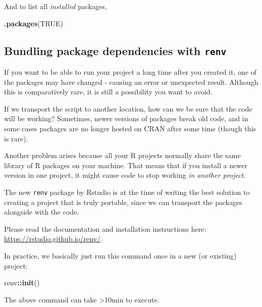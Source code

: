 \documentclass[]{book}
\newenvironment{Shaded}{\begin{snugshade}}{\end{snugshade}}
\newcommand{\KeywordTok}[1]{\textcolor[rgb]{0.13,0.29,0.53}{\textbf{#1}}}
\newcommand{\NormalTok}[1]{#1}
\newcommand{\OperatorTok}[1]{\textcolor[rgb]{0.81,0.36,0.00}{\textbf{#1}}}
\newcommand{\OtherTok}[1]{\textcolor[rgb]{0.56,0.35,0.01}{#1}}
\let\BeginKnitrBlock\begin \let\EndKnitrBlock\end
\begin{document}
And to list all \emph{installed} packages,

\begin{Shaded}
\begin{Highlighting}[]
\KeywordTok{.packages}\NormalTok{(}\OtherTok{TRUE}\NormalTok{)}
\end{Highlighting}
\end{Shaded}

\hypertarget{bundling-package-dependencies-with-renv}{%
\subsection{\texorpdfstring{Bundling package dependencies with \texttt{renv}}{Bundling package dependencies with renv}}\label{bundling-package-dependencies-with-renv}}

If you want to be able to run your project a long time after you created it, one of the packages may have changed - causing an error or unexpected result. Although this is comparatively rare, it is still a possibility you want to avoid.

If we transport the script to another location, how can we be sure that the code will be working? Sometimes, newer versions of packages break old code, and in some cases packages are no longer hosted on CRAN after some time (though this is rare).

Another problem arises because all your R projects normally share the same library of R packages on your machine. That means that if you install a newer version in one project, it might cause code to stop working \emph{in another project}.

The new \texttt{renv} package by Rstudio is at the time of writing the best solution to creating a project that is truly portable, since we can transport the packages alongside with the code.

\BeginKnitrBlock{rmdtry}
Please read the documentation and installation instructions here: \url{https://rstudio.github.io/renv/}.
\EndKnitrBlock{rmdtry}

In practice, we basically just run this command once in a new (or existing) project:

\begin{Shaded}
\begin{Highlighting}[]
\NormalTok{renv}\OperatorTok{::}\KeywordTok{init}\NormalTok{()}
\end{Highlighting}
\end{Shaded}

\BeginKnitrBlock{rmdcaution}
The above command can take \textgreater10min to execute.
\EndKnitrBlock{rmdcaution}
\end{document}
